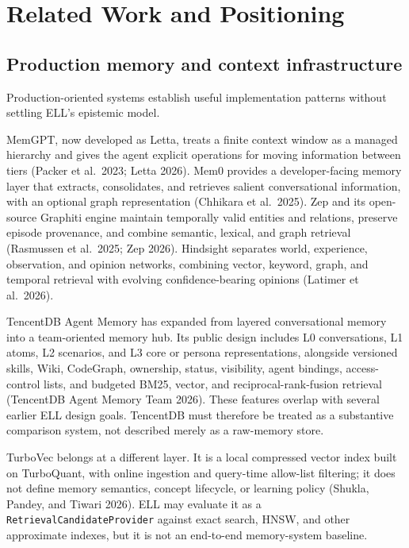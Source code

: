 \documentclass[
  english,
  a4paper,
  DIV=11,
  numbers=noendperiod]{scrreprt}
\begin{document}

\chapter{Related Work and
Positioning}\label{related-work-and-positioning}

\section{Production memory and context
infrastructure}\label{production-memory-and-context-infrastructure}

Production-oriented systems establish useful implementation patterns
without settling ELL's epistemic model.

MemGPT, now developed as Letta, treats a finite context window as a
managed hierarchy and gives the agent explicit operations for moving
information between tiers (Packer et al.~2023; Letta 2026). Mem0
provides a developer-facing memory layer that extracts, consolidates,
and retrieves salient conversational information, with an optional graph
representation (Chhikara et al.~2025). Zep and its open-source Graphiti
engine maintain temporally valid entities and relations, preserve
episode provenance, and combine semantic, lexical, and graph retrieval
(Rasmussen et al.~2025; Zep 2026). Hindsight separates world,
experience, observation, and opinion networks, combining vector,
keyword, graph, and temporal retrieval with evolving confidence-bearing
opinions (Latimer et al.~2026).

TencentDB Agent Memory has expanded from layered conversational memory
into a team-oriented memory hub. Its public design includes L0
conversations, L1 atoms, L2 scenarios, and L3 core or persona
representations, alongside versioned skills, Wiki, CodeGraph, ownership,
status, visibility, agent bindings, access-control lists, and budgeted
BM25, vector, and reciprocal-rank-fusion retrieval (TencentDB Agent
Memory Team 2026). These features overlap with several earlier ELL
design goals. TencentDB must therefore be treated as a substantive
comparison system, not described merely as a raw-memory store.

TurboVec belongs at a different layer. It is a local compressed vector
index built on TurboQuant, with online ingestion and query-time
allow-list filtering; it does not define memory semantics, concept
lifecycle, or learning policy (Shukla, Pandey, and Tiwari 2026). ELL may
evaluate it as a \texttt{RetrievalCandidateProvider} against exact
search, HNSW, and other approximate indexes, but it is not an end-to-end
memory-system baseline.
\end{document}
